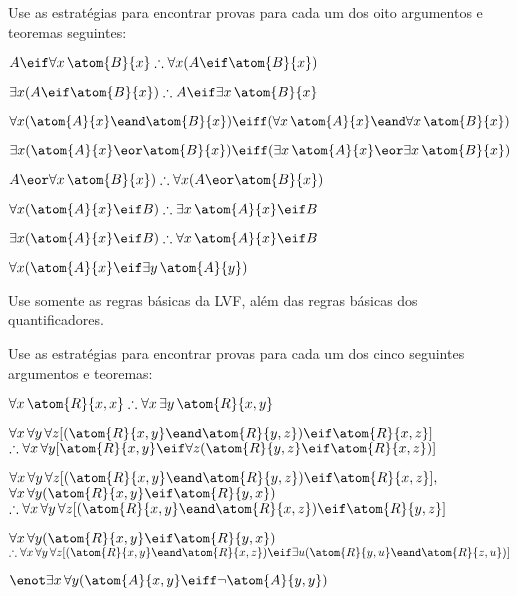 \practiceproblems

\problempart
Use as estrat\'egias  para encontrar provas para cada um dos oito argumentos e teoremas seguintes:
 
\begin{earg}
\item $A \eif \forall x\,\atom{B}{x} \therefore \forall x(A \eif \atom{B}{x})$
\item $\exists x(A \eif \atom{B}{x}) \therefore A \eif \exists x\, \atom{B}{x}$
\item $\forall x(\atom{A}{x} \eand \atom{B}{x}) \eiff (\forall x\,\atom{A}{x} \eand \forall x\,\atom{B}{x})$
\item $\exists x(\atom{A}{x} \eor \atom{B}{x}) \eiff (\exists x\,\atom{A}{x} \eor \exists x\,\atom{B}{x})$
\item $A \eor \forall x\,\atom{B}{x}) \therefore \forall x(A \eor \atom{B}{x})$
\item $\forall x(\atom{A}{x} \eif B) \therefore \exists x\,\atom{A}{x} \eif B$
\item $\exists x(\atom{A}{x} \eif B) \therefore \forall x\,\atom{A}{x} \eif B$
\item $\forall x(\atom{A}{x} \eif \exists y\,\atom{A}{y})$
\end{earg}
Use somente as regras b\'asicas da LVF, al\'em das regras b\'asicas dos quantificadores.

\problempart
Use as estrat\'egias para encontrar provas para cada um dos cinco seguintes argumentos e teoremas:
\begin{earg}
\item $\forall x\,\atom{R}{x,x} \therefore \forall x\,\exists y\,\atom{R}{x,y}$
\item $\forall x\,\forall y\,\forall z[(\atom{R}{x,y} \eand \atom{R}{y,z}) \eif \atom{R}{x,z}]$ \\
$\therefore \forall x\,\forall y[\atom{R}{x,y} \eif \forall z(\atom{R}{y,z} \eif \atom{R}{x,z})]$
\item $\forall x\,\forall y\,\forall z[(\atom{R}{x,y} \eand \atom{R}{y,z}) \eif \atom{R}{x,z}],$\\ $\forall x\,\forall y(\atom{R}{x,y} \eif \atom{R}{y, x})$ \\ $\therefore \forall x\,\forall y\,\forall z[(\atom{R}{x,y} \eand \atom{R}{x,z}) \eif \atom{R}{y,z}]$
\item $\forall x\,\forall y(\atom{R}{x,y} \eif \atom{R}{y, x})$ \\$\therefore \forall x\,\forall y\,\forall z[(\atom{R}{x,y} \eand \atom{R}{x,z}) \eif \exists u(\atom{R}{y,u} \eand \atom{R}{z,u})]$
\item $\enot \exists x\,\forall y (\atom{A}{x, y} \eiff \lnot\atom{A}{y, y})$
\end{earg}

